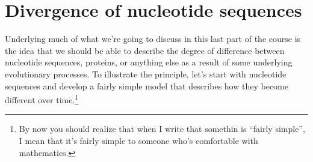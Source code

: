 \documentclass[12pt]{article}
\begin{document}
\section*{Divergence of nucleotide sequences}

Underlying much of what we're going to discuss in this last part of
the course is the idea that we should be able to describe the degree
of difference between nucleotide sequences, proteins, or anything else
as a result of some underlying evolutionary processes. To illustrate
the principle, let's start with nucleotide sequences and develop a
fairly simple model that describes how they become different over
time.\footnote{By now you should realize that when I write that
  somethin is ``fairly simple'', I mean that it's fairly simple to
  someone who's comfortable with mathematics.}
\end{document}

